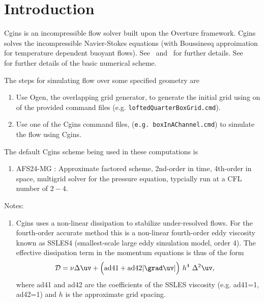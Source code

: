 \documentclass[11pt]{article}
\begin{document}
\tableofcontents

\clearpage


\section{Introduction}

Cgins is an incompressible flow solver built upon the Overture framework.
Cgins solves the incompressible Navier-Stokes equations (with Boussinesq approimation
for temperature dependent buoyant flows). See~\cite{CginsUserGuide} and~\cite{CginsReferenceManual} for further 
details. See~\cite{ICNS}~\cite{splitStep2003} for further details of the basic numerical scheme. 

The steps for simulating flow over some specified geometry are
\begin{enumerate}
  \item Use Ogen, the overlapping grid generator, to generate the initial grid using on of the provided command files (e.g. {\tt loftedQuarterBoxGrid.cmd}).
  \item Use one of the Cgins command files,  ({\tt e.g. boxInAChannel.cmd}) to simulate the flow using Cgins.
\end{enumerate}

The default Cgins scheme being used in these computations is 
\begin{enumerate}
  \item AFS24-MG : Approximate factored scheme, 2nd-order in time, 4th-order in space, multigrid solver for the pressure equation,
    typcially run at a CFL number of $2-4$. 
\end{enumerate}

Notes:
\begin{enumerate}
  \item Cgins uses a non-linear dissipation to stabilize under-resolved flows. For the fourth-order accurate method this is
    a non-linear fourth-order eddy viscosity known as SSLES4 (smallest-scale large eddy simulation model, order 4).
  The effective dissipation term in the momentum equations is thus of the form
  \begin{align*}
     \Dc & =  \nu \Delta \uv  + \Big(\text{ad41} + \text{ad42} \vert \grad\uv\vert \Big) ~h^4~ \Delta^2 \uv , 
  \end{align*}
  where ad41 and ad42 are the coefficients of the SSLES viscosity (e.g. ad41=1, ad42=1) and $h$ is the approximate grid spacing.
\end{enumerate}

\clearpage
\newcommand{\boxDir}{.}


\clearpage


\end{document}
